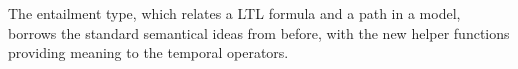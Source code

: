 \documentclass{article}
\begin{document}
The entailment type, which relates a LTL formula and a path in a model, borrows
the standard semantical ideas from before, with the new helper functions
providing meaning to the temporal operators.

\begin{code}%
%
\>[4]\<%
\\
%
\>[4]\AgdaSpace{}%
\AgdaSymbol{:}\AgdaSpace{}%
\AgdaSpace{}%
\AgdaSpace{}%
\AgdaSpace{}%
\AgdaSpace{}%
\<%
\\
%
\>[4]\AgdaSpace{}%
\AgdaSpace{}%
%
\>[18]\AgdaSymbol{=}\AgdaSpace{}%
\<%
\\
%
\>[4]\AgdaSpace{}%
\AgdaSpace{}%
%
\>[18]\AgdaSymbol{=}\AgdaSpace{}%
\<%
\\
%
\>[4]\AgdaSpace{}%
\AgdaSpace{}%
\AgdaSpace{}%
%
\>[18]\AgdaSymbol{=}\AgdaSpace{}%
\AgdaSpace{}%
\AgdaSymbol{(}\AgdaSpace{}%
\AgdaSpace{}%
\AgdaSymbol{)}\AgdaSpace{}%
\<%
\\
%
\>[4]\AgdaSpace{}%
\AgdaSpace{}%
\AgdaSymbol{(}\AgdaSpace{}%
\AgdaSymbol{)}%
\>[18]\AgdaSymbol{=}\AgdaSpace{}%
\AgdaSpace{}%
\AgdaSymbol{(}\AgdaSpace{}%
\AgdaSpace{}%
\AgdaSymbol{)}\<%
\\
%
\>[4]\AgdaSpace{}%
\AgdaSpace{}%
\AgdaSymbol{(}\AgdaSpace{}%
\AgdaSpace{}%
\AgdaSymbol{)}\AgdaSpace{}%
\AgdaSymbol{=}\AgdaSpace{}%
\AgdaSymbol{(}\AgdaSpace{}%
\AgdaSpace{}%
\AgdaSymbol{)}\AgdaSpace{}%
\AgdaSpace{}%
\AgdaSymbol{(}\AgdaSpace{}%
\AgdaSpace{}%
\AgdaSymbol{)}\<%
\\
%
\>[4]\AgdaSpace{}%
\AgdaSpace{}%
\AgdaSymbol{(}\AgdaSpace{}%
\AgdaSpace{}%

\end{code}
\end{document}
